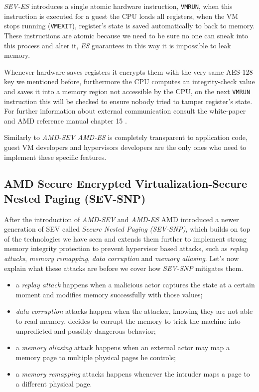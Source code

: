 \documentclass[twocolumn]{article}
\begin{document}
\textit{SEV-ES} introduces a single atomic hardware instruction, \texttt{VMRUN}, when this instruction is executed for a guest the CPU loads all registers, when the VM stops running (\texttt{VMEXIT}), register's state is saved automatically to  back to memory. These instructions are atomic because we need to be sure no one can sneak into this process and alter it, \textit{ES} guarantees in this way it is impossible to leak memory.

Whenever hardware saves registers it encrypts them with the very same AES-128 key we mentioned before, furthermore the CPU computes an integrity-check value and saves it into a memory region not accessible by the CPU, on the next \texttt{VMRUN} instruction this will be checked to ensure nobody tried to tamper register's state. For further information about external communication consult the white-paper \cite{protecting-registers} and AMD reference manual chapter 15 \cite{architecture-reference}.

Similarly to \textit{AMD-SEV} \textit{AMD-ES} is completely transparent to application code, guest VM developers and hypervisors developers are the only ones who  need to implement these specific features.

\subsection{AMD Secure Encrypted Virtualization-Secure Nested Paging (SEV-SNP)}

After the introduction of \textit{AMD-SEV} and \textit{AMD-ES} AMD introduced a newer generation of SEV called \textit{Secure Nested Paging (SEV-SNP)}, which builds on top of the technologies we have seen and extends them further to implement strong memory integrity protection to prevent hypervisor based attacks, such as \textit{replay attacks}, \textit{memory remapping}, \textit{data corruption} and \textit{memory aliasing}.
Let's now explain what these attacks are before we cover how \textit{SEV-SNP} mitigates them.

\begin{itemize}
    \item a \textit{replay attack} happens when a malicious actor captures the state at a certain moment and modifies memory successfully with those values;
    \item \textit{data corruption} attacks happen when the attacker, knowing they are not able to read memory, decides to corrupt the memory to trick the machine into unpredicted and possibly dangerous behavior;
    \item a \textit{memory aliasing} attack happens when an external actor may map a memory page to multiple physical pages he controls;
    \item a \textit{memory remapping} attacks happens whenever the intruder maps a page to a different physical page.
\end{itemize}
\end{document}
